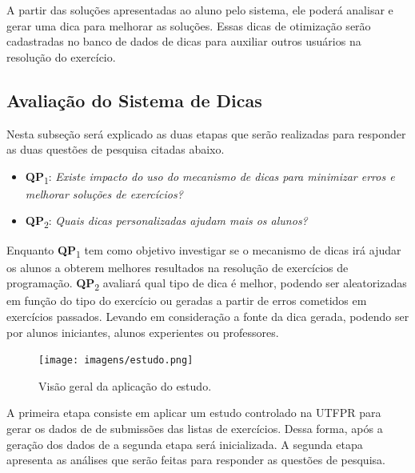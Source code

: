 A partir das soluções apresentadas ao aluno pelo sistema, ele poderá analisar e gerar uma dica para melhorar as soluções. Essas dicas de otimização serão cadastradas no banco de dados de dicas para auxiliar outros usuários na resolução do exercício.

\subsection{Avaliação do Sistema de Dicas}

Nesta subseção será explicado as duas etapas que serão realizadas para responder as duas questões de pesquisa citadas abaixo.

\begin{itemize}
	\item \textbf{QP}\textsubscript{1}: 
	\textit{Existe impacto do uso do mecanismo de dicas para minimizar erros e melhorar soluções de exercícios?}
	\foreign
	\item \textbf{QP}\textsubscript{2}: 
	\textit{Quais dicas personalizadas ajudam mais os alunos?}
\end{itemize}

Enquanto \textbf{QP}\textsubscript{1} tem como objetivo investigar se o mecanismo de dicas irá ajudar os alunos a obterem melhores resultados na resolução de exercícios de programação. \textbf{QP}\textsubscript{2} avaliará qual tipo de dica é melhor, podendo ser aleatorizadas em função do tipo do exercício ou geradas a partir de erros cometidos em exercícios passados. Levando em consideração a fonte da dica gerada, podendo ser por alunos iniciantes, alunos experientes ou professores.

\begin{figure}[ht]
	\centering
	\captionsetup{justification=centering}
	\texttt{[image: imagens/estudo.png]}
	\caption{Visão geral da aplicação do estudo.}
	\label{figura:estudo}
\end{figure}

A primeira etapa consiste em aplicar um estudo controlado na UTFPR para gerar os dados de  de submissões das listas de exercícios. Dessa forma, após a geração dos dados de  a segunda etapa será inicializada. A segunda etapa apresenta as análises que serão feitas para responder as questões de pesquisa.

